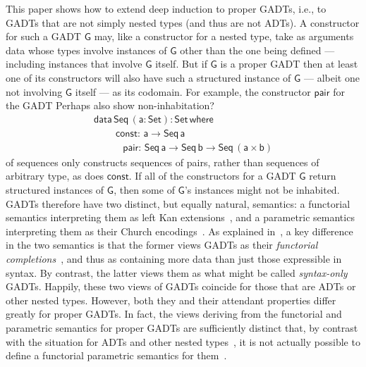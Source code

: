 \documentclass[9pt]{entcs}
\begin{document}
This paper shows how to extend deep induction to proper GADTs, i.e.,
to GADTs that are not simply nested types (and thus are not ADTs).  A
constructor for such a GADT $\mathsf{G}$ may, like a constructor for a
nested type, take as arguments data whose types involve instances of
$\mathsf{G}$ other than the one being defined --- including instances
that involve $\mathsf{G}$ itself. But if $\mathsf{G}$ is a proper GADT
then at least one of its constructors will also have such a structured
instance of $\mathsf{G}$ --- albeit one not involving $\mathsf{G}$
itself --- as its codomain.
For example, the constructor $\mathsf{pair}$ for the GADT {\color{red}
  Perhaps also show non-inhabitation?}
\begin{equation}\label{eq:seq}
\begin{array}{l}
\mathsf{data\, Seq\,(a : Set) : Set\,where}\\
\mathsf{\;\;\;\;\;\;\;\;const :\, a \to Seq\,a}\\
\mathsf{\;\;\;\;\;\;\;\;\;\;\,pair :\, Seq \,a \to Seq\,b \to
  Seq\,(a \times b)}
\end{array}
\end{equation}
\noindent
of sequences only constructs sequences of pairs, rather than sequences
of arbitrary type, as does $\mathsf{const}$. If all of the
constructors for a GADT $\mathsf{G}$ return structured instances of
$\mathsf{G}$, then some of $\mathsf{G}$'s instances might not be
inhabited. GADTs therefore have two distinct, but equally natural,
semantics: a functorial semantics interpreting them as left Kan
extensions~\cite{mac71}, and a parametric semantics interpreting them
as their Church encodings~\cite{atk12,vw10}. As explained
in~\cite{jgj21}, a key difference in the two semantics is that the
former views GADTs as their {\em functorial completions}~\cite{jp19},
and thus as containing more data than just those expressible in
syntax. By contrast, the latter views them as what might be called
{\em syntax-only} GADTs. Happily, these two views of GADTs coincide
for those that are ADTs or other nested types. However, both they and
their attendant properties differ greatly for proper GADTs. In fact,
the views deriving from the functorial and parametric semantics for
proper GADTs are sufficiently distinct that, by contrast with the
situation for ADTs and other nested
types~\cite{bfss90,gjfor15,jgj21f}, it is not actually possible to
define a functorial parametric semantics for them~\cite{jgj21}.
\end{document}
